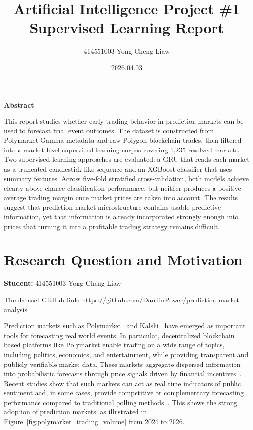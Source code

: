 \documentclass[11pt]{article}
\title{Artificial Intelligence Project \#1 Supervised Learning Report}
\author[1]{414551003 Yong-Cheng Liaw}
\affil[1]{National Yang Ming Chiao Tung University}
\date{2026.04.03}
\makeatletter
\renewcommand\maketitle{%
  \begin{center}
    {\LARGE\bfseries\textcolor{black}{\@title}\par}
    {\normalsize\@author \par}
  \end{center}\par
}
\renewenvironment{abstract}{
  \begin{center}\bfseries Abstract\end{center}\vspace{-4pt}
  \small
}{\par\normalsize\vspace{4pt}}
\makeatother
\begin{document}
\thispagestyle{firststyle}
\vspace*{-20pt}
\maketitle

\begin{abstract}
This report studies whether early trading behavior in prediction markets can be used to forecast final event outcomes. The dataset is constructed from Polymarket Gamma metadata and raw Polygon blockchain trades, then filtered into a market-level supervised learning corpus covering 1,235 resolved markets. Two supervised learning approaches are evaluated: a GRU that reads each market as a truncated candlestick-like sequence and an XGBoost classifier that uses summary features. Across five-fold stratified cross-validation, both models achieve clearly above-chance classification performance, but neither produces a positive average trading margin once market prices are taken into account. The results suggest that prediction market microstructure contains usable predictive information, yet that information is already incorporated strongly enough into prices that turning it into a profitable trading strategy remains difficult.
\end{abstract}

\section{Research Question and Motivation}

\textbf{Student:} 414551003 Yong-Cheng Liaw

The dataset GitHub link: \url{https://github.com/DandinPower/prediction-market-analysis}

Prediction markets such as Polymarket~\cite{tsang2026polymarket} and Kalshi~\cite{kalshiPlatform} have emerged as important tools for forecasting real world events. In particular, decentralized blockchain based platforms like Polymarket enable trading on a wide range of topics, including politics, economics, and entertainment, while providing transparent and publicly verifiable market data. These markets aggregate dispersed information into probabilistic forecasts through price signals driven by financial incentives~\cite{urquhart2025decentralized}. Recent studies show that such markets can act as real time indicators of public sentiment and, in some cases, provide competitive or complementary forecasting performance compared to traditional polling methods~\cite{reichenbach2025exploring}. This shows the strong adoption of prediction markets, as illustrated in Figure~\ref{fig:polymarket_trading_volume} from 2024 to 2026.
\end{document}
